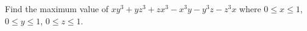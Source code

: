 Find the maximum value of $xy^3 + yz^3 + zx^3 - x^3y - y^3z - z^3x$ where $0
\le x \le 1$, $0 \le y \le 1$, $0 \le z \le 1$.
